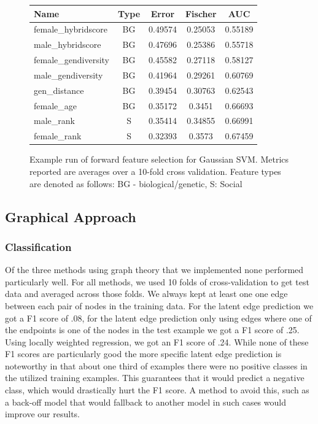 \documentclass[twoside,twocolumn,paper=letter,fontsize=11pt]{article}
\begin{document}
\begin{figure}
      \centering
      \begin{tabular}{|l|c|c|c|c|}
        \hline
        Name & Type & Error & Fischer & AUC \\
        \hline
        female\_hybridscore  & BG  & 0.49574 & 0.25053 & 0.55189\\
        male\_hybridscore  & BG  & 0.47696 & 0.25386 & 0.55718\\
        female\_gendiversity & BG  & 0.45582 & 0.27118 & 0.58127\\
        male\_gendiversity & BG  & 0.41964 & 0.29261 & 0.60769\\
        gen\_distance & BG  & 0.39454 & 0.30763 & 0.62543\\
        female\_age &  BG  & 0.35172 & 0.3451  & 0.66693\\
        male\_rank & S & 0.35414 & 0.34855 & 0.66991\\
        female\_rank & S & 0.32393 & 0.3573  & 0.67459\\
        \hline
      \end{tabular}
  \caption{Example run of forward feature selection for Gaussian SVM. Metrics
    reported are averages over a 10-fold cross validation.
  Feature types are denoted as follows: BG - biological/genetic, S: Social}
  \label{fig:rbf_svm_feat_selection}
\end{figure}


\subsection{Graphical Approach}
\subsubsection*{Classification}

Of the three methods using graph theory that we implemented none performed
particularly well. For all methods, we used 10 folds of cross-validation
to get test data and averaged across those folds. We always kept at least one
one edge between each pair of nodes in the training data. For the latent edge
prediction we got a F1 score of .08, for the latent edge prediction only using
edges where one of the endpoints is one of the nodes in the test example we got
a F1 score of .25. Using locally weighted regression, we got an F1 score of
.24. While none of these F1 scores are particularly good the more specific
latent edge prediction is noteworthy in that about one third of examples there
were no positive classes in the utilized training examples. This guarantees
that it would predict a negative class, which would drastically hurt the F1
score. A method to avoid this, such as a back-off model that would
fallback to another model in such cases would improve our results.\\
\end{document}

